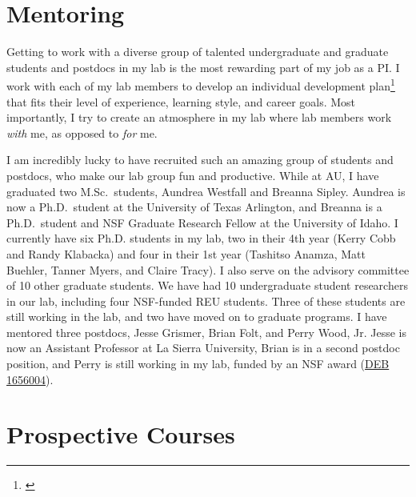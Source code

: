 \section*{Mentoring}
Getting to work with a diverse group of talented undergraduate and graduate
students and postdocs in my lab is the most rewarding part of my job as a
PI.
I work with each of my lab members to develop an individual development
plan\footnote{\label{idp}} that fits
their level of experience, learning style, and career goals.
Most importantly, I try to create an atmosphere in my lab where
lab members work \emph{with} me, as opposed to \emph{for} me.

I am incredibly lucky to have recruited such an amazing group of students and
postdocs, who make
our lab group fun and productive.
While at AU, I have graduated two M.Sc.\ students, Aundrea Westfall
and Breanna Sipley.
Aundrea is now a Ph.D.\ student at the University of Texas Arlington,
and
Breanna is a Ph.D.\ student and NSF Graduate Research Fellow at the University
of Idaho.
I currently have six Ph.D. students in my lab, two in their 4th
year (Kerry Cobb and Randy Klabacka) and four in their 1st year
(Tashitso Anamza, Matt Buehler, Tanner Myers, and Claire Tracy).
I also serve on the advisory committee of 10 other graduate students.
We have had 10 undergraduate student researchers in our lab, including four
NSF-funded REU students.
Three of these students are still working in the lab,
and two have moved on to graduate programs.
I have mentored three postdocs, Jesse Grismer, Brian Folt, and Perry Wood, Jr.
Jesse is now an Assistant Professor at La Sierra University,
Brian is in a second postdoc position,
and Perry is still working in my lab, funded by an NSF award
(\href{https://www.nsf.gov/awardsearch/showAward?AWD_ID=1656004&HistoricalAwards=false}{DEB 1656004}).


\section*{Prospective Courses}


